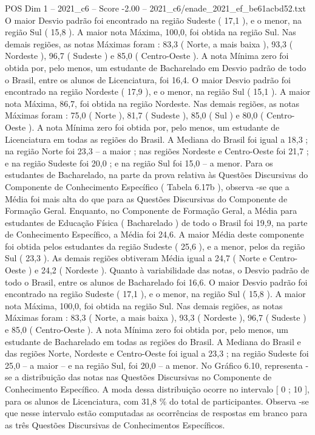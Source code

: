 \begin{textsample}{POS Dim 1 – 2021\_c6 – Score -2.00 – 2021\_c6/enade\_2021\_ef\_be61acbd52.txt}
O maior Desvio padrão foi encontrado na região Sudeste ( 17,1 ), e o menor, na região Sul ( 15,8 ).
A maior nota Máxima, 100,0, foi obtida na região Sul.
Nas demais regiões, as notas Máximas foram : 83,3 ( Norte, a mais baixa ), 93,3 ( Nordeste ), 96,7 ( Sudeste ) e 85,0 ( Centro-Oeste ).
A nota Mínima zero foi obtida por, pelo menos, um estudante de Bacharelado em Desvio padrão de todo o Brasil, entre os alunos de Licenciatura, foi 16,4.
O maior Desvio padrão foi encontrado na região Nordeste ( 17,9 ), e o menor, na região Sul ( 15,1 ).
A maior nota Máxima, 86,7, foi obtida na região Nordeste.
Nas demais regiões, as notas Máximas foram : 75,0 ( Norte ), 81,7 ( Sudeste ), 85,0 ( Sul ) e 80,0 ( Centro-Oeste ).
A nota Mínima zero foi obtida por, pelo menos, um estudante de Licenciatura em todas as regiões do Brasil.
A Mediana do Brasil foi igual a 18,3 ; na região Norte foi 23,3 – a maior ; nas regiões Nordeste e Centro-Oeste foi 21,7 ; e na região Sudeste foi 20,0 ; e na região Sul foi 15,0 – a menor.
Para os estudantes de Bacharelado, na parte da prova relativa às Questões Discursivas do Componente de Conhecimento Específico ( Tabela 6.17b ), observa -se que a Média foi mais alta do que para as Questões Discursivas do Componente de Formação Geral.
Enquanto, no Componente de Formação Geral, a Média para estudantes de Educação Física ( Bacharelado ) de todo o Brasil foi 19,9, na parte de Conhecimento Específico, a Média foi 24,6.
A maior Média deste componente foi obtida pelos estudantes da região Sudeste ( 25,6 ), e a menor, pelos da região Sul ( 23,3 ).
As demais regiões obtiveram Média igual a 24,7 ( Norte e Centro-Oeste ) e 24,2 ( Nordeste ).
Quanto à variabilidade das notas, o Desvio padrão de todo o Brasil, entre os alunos de Bacharelado foi 16,6.
O maior Desvio padrão foi encontrado na região Sudeste ( 17,1 ), e o menor, na região Sul ( 15,8 ).
A maior nota Máxima, 100,0, foi obtida na região Sul.
Nas demais regiões, as notas Máximas foram : 83,3 ( Norte, a mais baixa ), 93,3 ( Nordeste ), 96,7 ( Sudeste ) e 85,0 ( Centro-Oeste ).
A nota Mínima zero foi obtida por, pelo menos, um estudante de Bacharelado em todas as regiões do Brasil.
A Mediana do Brasil e das regiões Norte, Nordeste e Centro-Oeste foi igual a 23,3 ; na região Sudeste foi 25,0 – a maior – e na região Sul, foi 20,0 – a menor.
No Gráfico 6.10, representa -se a distribuição das notas nas Questões Discursivas no Componente de Conhecimento Específico.
A moda dessa distribuição ocorre no intervalo [ 0 ; 10 ], para os alunos de Licenciatura, com 31,8 \% do total de participantes.
Observa -se que nesse intervalo estão computadas as ocorrências de respostas em branco para as três Questões Discursivas de Conhecimentos Específicos.

\end{textsample}
